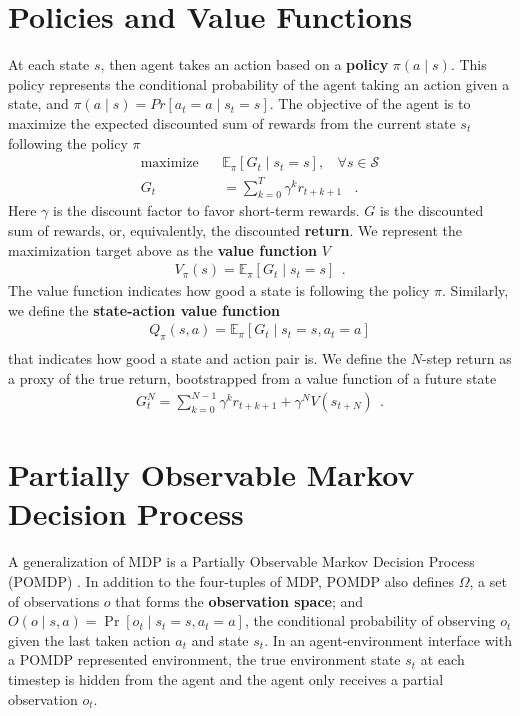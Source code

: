 \section{Policies and Value Functions} \label{sec:policies_and_functions}
At each state $s$, then agent takes an action based on a \textbf{policy} $\pi(a \mid s)$.
This policy represents the conditional probability of the agent taking an action given a state, and $\pi(a \mid s) = Pr[ a_{t} = a \mid  s_t = s]$.
The objective of the agent is to maximize the expected discounted sum of rewards from the current state $s_t$ following the policy $\pi$
\begin{align}
    \text{maximize} ~~~~  & \mathbb{E}_{\pi}\left[ G_t \mid s_t = s \right] , ~~~~ \forall s \in \mathcal{S} \label{eq:maximize_return} \\
    G_t                   & = \sum_{k=0}^{T} \gamma^{k} r_{t+k+1} ~~~~ . 
\end{align}
Here $\gamma$ is the discount factor to favor short-term rewards.
$G$ is the discounted sum of rewards, or, equivalently, the discounted \textbf{return}.
We represent the maximization target above as the \textbf{value function} $V$
\begin{align*}
    V_\pi(s) = \mathbb{E}_{\pi}\left[ G_t \mid s_t = s \right] ~~.
\end{align*}
The value function indicates how good a state is following the policy $\pi$.
Similarly, we define the \textbf{state-action value function}
\begin{align*}
    Q_\pi(s, a) = \mathbb{E}_{\pi}\left[ G_t \mid s_t = s, a_t = a \right]  \\
\end{align*}
that indicates how good a state and action pair is.
We define the $N$-step return as a proxy of the true return, bootstrapped from a value function of a future state
\begin{align*}
    G^N_t = \sum_{k=0}^{N - 1} \gamma^{k} r_{t+k+1} + \gamma^{N} V(s_{t+N}) ~~ .
\end{align*}

\section{Partially Observable Markov Decision Process} \label{sec:pomdp}
A generalization of MDP is a Partially Observable Markov Decision Process (POMDP) \cite{OptimalControlMarkov_Astrom_1965}.
In addition to the four-tuples of MDP, POMDP also defines $\Omega$, a set of observations $o$ that forms the \textbf{observation space}; and $O(o \mid s, a) = \operatorname{Pr}[o_t \mid s_t = s, a_t = a]$, the conditional probability of observing $o_t$ given the last taken action $a_t$ and state $s_t$.
In an agent-environment interface with a POMDP represented environment, the true environment state $s_t$ at each timestep is hidden from the agent and the agent only receives a partial observation $o_t$.


